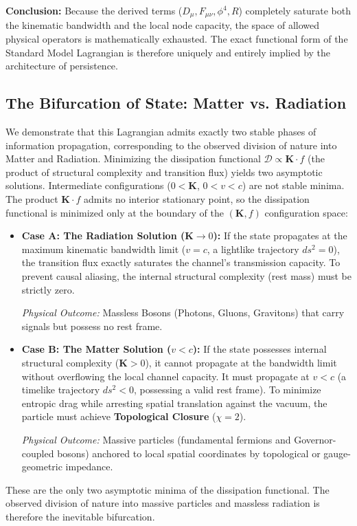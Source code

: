 \textbf{Conclusion:} Because the derived terms ($D_\mu, F_{\mu\nu}, \phi^4, R$) completely saturate both the kinematic bandwidth and the local node capacity, the space of allowed physical operators is mathematically exhausted. The exact functional form of the Standard Model Lagrangian is therefore uniquely and entirely implied by the architecture of persistence.

\subsection{The Bifurcation of State: Matter vs. Radiation}
\label{sec:matter_radiation}

We demonstrate that this Lagrangian admits exactly two stable phases of information propagation, corresponding to the observed division of nature into Matter and Radiation. Minimizing the dissipation functional $\mathcal{D} \propto \mathbf{K} \cdot f$ (the product of structural complexity and transition flux) yields two asymptotic solutions. Intermediate configurations ($0 < \mathbf{K}$, $0 < v < c$) are not stable minima. The product $\mathbf{K} \cdot f$ admits no interior stationary point, so the dissipation functional is minimized only at the boundary of the $(\mathbf{K}, f)$ configuration space:

\begin{itemize}
    \item \textbf{Case A: The Radiation Solution ($\mathbf{K} \to 0$):} 
    If the state propagates at the maximum kinematic bandwidth limit ($v=c$, a lightlike trajectory $ds^2=0$), the transition flux exactly saturates the channel's transmission capacity. To prevent causal aliasing, the internal structural complexity (rest mass) must be strictly zero. 
    
    \textit{Physical Outcome:} Massless Bosons (Photons, Gluons, Gravitons) that carry signals but possess no rest frame.

    \item \textbf{Case B: The Matter Solution ($v < c$):}
    If the state possesses internal structural complexity ($\mathbf{K} > 0$), it cannot propagate at the bandwidth limit without overflowing the local channel capacity. It must propagate at $v < c$ (a timelike trajectory $ds^2 < 0$, possessing a valid rest frame). To minimize entropic drag while arresting spatial translation against the vacuum, the particle must achieve \textbf{Topological Closure} ($\chi=2$). 
    
    \textit{Physical Outcome:} Massive particles (fundamental fermions and Governor-coupled bosons) anchored to local spatial coordinates by topological or gauge-geometric impedance.
\end{itemize}

These are the only two asymptotic minima of the dissipation functional. The observed division of nature into massive particles and massless radiation is therefore the inevitable bifurcation.